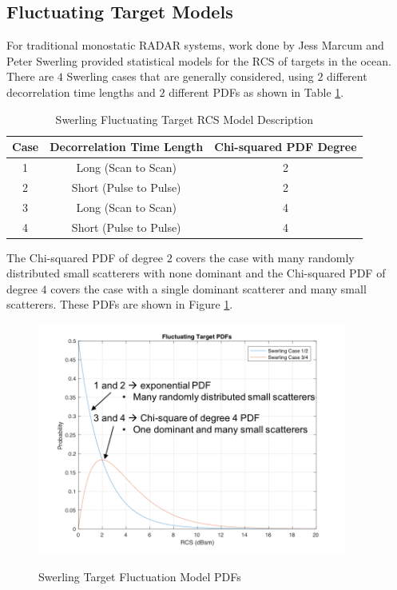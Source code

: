 \subsection{Fluctuating Target Models}
For traditional monostatic RADAR systems, work done by Jess Marcum and Peter Swerling provided statistical models for the RCS of targets in the ocean\cite{richards_radar}. There are $4$ Swerling cases that are generally considered, using $2$ different decorrelation time lengths and $2$ different PDFs as shown in Table \ref{env_tab:1}. 

\begin{table}[H]
  \begin{center}
      \renewcommand{\baselinestretch}{1} \small\normalsize
  \begin{quote}
    \caption[Swerling Fluctuating Target RCS Model Description]{Swerling Fluctuating Target RCS Model Description\label{env_tab:1}}
  \end{quote}
  \begin{tabular} {|c | c | c |}
    \hline
  \bf{Case} & \bf{Decorrelation Time Length} & \bf{Chi-squared PDF Degree} \\ \hline
  1 &Long (Scan to Scan) &2 \\ \hline
  2 &Short (Pulse to Pulse) &2 \\ \hline
  3 &Long (Scan to Scan) &4 \\ \hline
  4 &Short (Pulse to Pulse) &4 \\ \hline
\end{tabular}
\end{center}
\end{table}
\renewcommand{\baselinestretch}{2} \small\normalsize
The Chi-squared PDF of degree $2$ covers the case with many randomly distributed small scatterers with none dominant and the Chi-squared PDF of degree $4$ covers the case with a single dominant scatterer and many small scatterers. These PDFs are shown in Figure \ref{env_fig:3}.
\begin{figure}[H]
  \begin{center}
\includegraphics[width=4in]{../media/multistatic/swerling_pdfs.png}
  \end{center}
  \renewcommand{\baselinestretch}{1} \small\normalsize
  \begin{quote}
    \caption[Swerling Target Fluctuation Model PDFs]{Swerling Target Fluctuation Model PDFs\label{env_fig:3}}
  \end{quote}
\end{figure}
